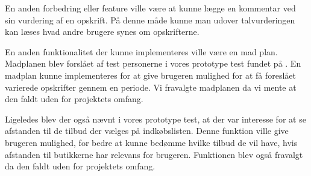 En anden forbedring eller feature ville være at kunne lægge en kommentar ved sin vurdering af en opskrift.
På denne måde kunne man udover talvurderingen kan læses hvad andre brugere synes om opskrifterne. 

En anden funktionalitet der kunne implementeres ville være en mad plan.
Madplanen blev forslået af test personerne i vores prototype test fundet på .
En madplan kunne implementeres for at give brugeren mulighed for at få foreslået varierede opskrifter gennem en periode.
Vi fravalgte madplanen da vi mente at den faldt uden for projektets omfang.

Ligeledes blev der også nævnt i vores prototype test, at der var interesse for at se afstanden til de tilbud der vælges på indkøbslisten.
Denne funktion ville give brugeren mulighed, for bedre at kunne bedømme hvilke tilbud de vil have, hvis afstanden til butikkerne har relevans for brugeren.
Funktionen blev også fravalgt da den faldt uden for projektets omfang.

